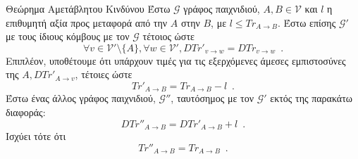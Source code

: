 {}
\begin{theoremgr}{Θεώρημα Αμετάβλητου Κινδύνου}
\label{riskinv}
  Έστω $\mathcal{G}$ γράφος παιχνιδιού, $A, B \in \mathcal{V}$ και $l$ η επιθυμητή αξία προς μεταφορά από την $A$ στην $B$, με
  $l \leq Tr_{A \rightarrow B}$. Έστω επίσης $\mathcal{G}'$ με τους ίδιους κόμβους με τον $\mathcal{G}$ τέτοιος ώστε
  \begin{equation*}
    \forall v \in \mathcal{V}' \setminus \{A\}, \forall w \in \mathcal{V}', DTr'_{v \rightarrow w} =
    DTr_{v \rightarrow w} \enspace.
  \end{equation*}
  Επιπλέον, υποθέτουμε ότι υπάρχουν τιμές για τις εξερχόμενες άμεσες εμπιστοσύνες της $A, DTr'_{A \rightarrow v}$, τέτοιες
  ώστε
  \begin{equation}
  \label{primetrust}
    Tr'_{A \rightarrow B} = Tr_{A \rightarrow B} - l \enspace.
  \end{equation}
  Έστω ένας άλλος γράφος παιχνιδιού, $\mathcal{G}''$, ταυτόσημος με τον $\mathcal{G}'$ εκτός της παρακάτω διαφοράς:
  \begin{equation*}
    DTr''_{A \rightarrow B} = DTr'_{A \rightarrow B} + l \enspace.
  \end{equation*}
  Ισχύει τότε ότι
  \begin{equation*}
    Tr''_{A \rightarrow B} = Tr_{A \rightarrow B} \enspace.
  \end{equation*}
\end{theoremgr}

